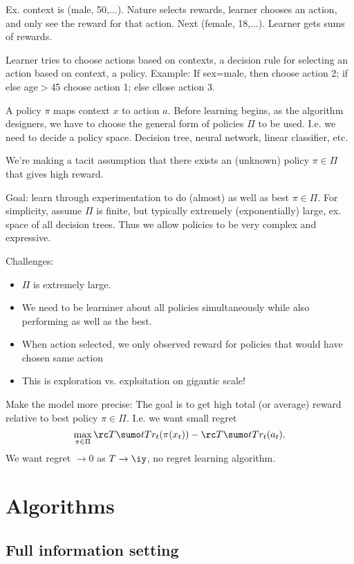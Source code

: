 Ex. context is (male, 50,...). Nature selects rewards, learner chooses an action, and only see the reward for that action. Next (female, 18,...). Learner gets sums of rewards.

Learner tries to choose actions based on contexts, a decision rule for selecting an action based on context, a policy. 
Example: If sex=male, then choose action 2; if else age$>$45 choose action 1; else cllose action 3.

A policy $\pi$ maps context $x$ to action $a$. Before learning begins, as the algorithm designers, we have to choose the general form of policies $\Pi$ to be used. I.e. we need to decide a policy space. Decision tree, neural network, linear classifier, etc. 

We're making a tacit assumption that there exists an (unknown) policy $\pi\in \Pi$ that gives high reward.

Goal: learn through experimentation to do (almost) as well as best $\pi\in \Pi$. For simplicity, assume $\Pi$ is finite, but typically extremely (exponentially) large, ex. space of all decision trees. Thus we allow policies to be very complex and expressive.

Challenges:
\begin{itemize}
\item
$\Pi$ is extremely large.
\item
We need to be learniner about all policies simultaneously while also performing as well as the best.
\item
When action selected, we only observed reward for policies that would have chosen same action
\item
This is exploration vs. exploitation on gigantic scale!
\end{itemize}

Make the model more precise: The goal is to get high total (or average) reward relative to best policy $\pi\in \Pi$. I.e. we want small regret
$$
\max_{\pi\in \Pi} \rc T\sumo tT r_t(\pi(x_t)) - \rc T\sumo tTr_t(a_t).
$$
We want regret $\to0$ as $T\to \iy$, no regret learning algorithm.

\section{Algorithms}

\subsection{Full information setting}

